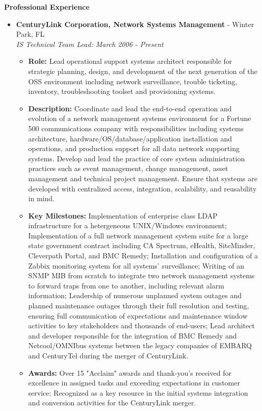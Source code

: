 \documentclass[10pt,oneside]{article}
\newenvironment{ressection}[1]{
	\vspace{4pt}
	\textbf{\selectfont\normalsize#1}
	\begin{itemize}
	\vspace{3pt}
}{
	\end{itemize}
}
\newcommand{\ressubitem}[1]{
	\vspace{-1pt}
	\item \begin{flushleft} #1 \end{flushleft}
}
\newcommand{\resbigitem}[3]{
	\vspace{-5pt}
	\item
	\textbf{#1} - #2 \\
	\textit{#3}
}
\newenvironment{ressubsec}[3]{
	\resbigitem{#1}{#2}{#3}
	\vspace{-2pt}
	\begin{itemize}
}{
	\end{itemize}
}
\begin{document}

\begin{ressection}{Professional Experience}

	\begin{ressubsec}{CenturyLink Corporation, Network Systems Management}{Winter Park, FL}{IS Technical Team Lead: March 2006 - Present}
		\ressubitem{\textbf{Role:} Lead operational support systems architect responsible for strategic planning, design, and development of the next generation of the OSS environment including network surveillance, trouble ticketing, inventory, troubleshooting toolset and provisioning systems.}
		
		\ressubitem{\textbf{Description:} Coordinate and lead the end-to-end operation and evolution of a network management systems environment for a Fortune 500 communications company with responsibilities including systems architecture, hardware/OS/database/application installation and operations, and production support for all data network supporting systems.  Develop and lead the practice of core system administration practices such as event management, change management, asset management and technical project management. Ensure that systems are developed with centralized access, integration, scalability, and reusability in mind.}

		\ressubitem{\textbf{Key Milestones:} Implementation of enterprise class LDAP infrastructure for a hetergeneous UNIX/Windows environment; Implementation of a full network management system suite for a large state government contract including CA Spectrum, eHealth, SiteMinder, Cleverpath Portal, and BMC Remedy; Installation and configuration of a Zabbix monitoring system for all systems' surveillance; Writing of an SNMP MIB from scratch to integrate two network management systems to forward traps from one to another, including relevant alarm information; Leadership of numerous unplanned system outages and planned maintenance outages through their full resolution and testing, ensuring full communication of expectations and maintenance window activities to key stakeholders and thousands of end-users; Lead architect and developer responsible for the integration of BMC Remedy and Netcool/OMNIbus systems between the legacy companies of EMBARQ and CenturyTel during the merger of CenturyLink.}
		
		\ressubitem{\textbf{Awards:} Over 15 "Acclaim" awards and thank-you's received for excellence in assigned tasks and exceeding expectations in customer service; Recognized as a key resource in the initial systems integration and conversion activities for the CenturyLink merger.}


\end{ressubsec}
\end{ressection}
\end{document}
